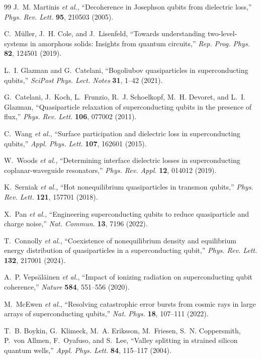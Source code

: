 \documentclass[11pt,letterpaper]{article}
\theoremstyle{definition}
\begin{document}
\begin{thebibliography}{99}
J.~M. Martinis \textit{et al.}, ``Decoherence in Josephson qubits from dielectric loss,'' \textit{Phys. Rev. Lett.} \textbf{95}, 210503 (2005).

C.~M\"uller, J.~H. Cole, and J.~Lisenfeld, ``Towards understanding two-level-systems in amorphous solids: Insights from quantum circuits,'' \textit{Rep. Prog. Phys.} \textbf{82}, 124501 (2019).

L.~I. Glazman and G.~Catelani, ``Bogoliubov quasiparticles in superconducting qubits,'' \textit{SciPost Phys. Lect. Notes} \textbf{31}, 1--42 (2021).

G.~Catelani, J.~Koch, L.~Frunzio, R.~J. Schoelkopf, M.~H. Devoret, and L.~I. Glazman, ``Quasiparticle relaxation of superconducting qubits in the presence of flux,'' \textit{Phys. Rev. Lett.} \textbf{106}, 077002 (2011).

C.~Wang \textit{et al.}, ``Surface participation and dielectric loss in superconducting qubits,'' \textit{Appl. Phys. Lett.} \textbf{107}, 162601 (2015).

W.~Woods \textit{et al.}, ``Determining interface dielectric losses in superconducting coplanar-waveguide resonators,'' \textit{Phys. Rev. Appl.} \textbf{12}, 014012 (2019).

K.~Serniak \textit{et al.}, ``Hot nonequilibrium quasiparticles in transmon qubits,'' \textit{Phys. Rev. Lett.} \textbf{121}, 157701 (2018).

X.~Pan \textit{et al.}, ``Engineering superconducting qubits to reduce quasiparticle and charge noise,'' \textit{Nat. Commun.} \textbf{13}, 7196 (2022).

T.~Connolly \textit{et al.}, ``Coexistence of nonequilibrium density and equilibrium energy distribution of quasiparticles in a superconducting qubit,'' \textit{Phys. Rev. Lett.} \textbf{132}, 217001 (2024).

A.~P. Veps\"al\"ainen \textit{et al.}, ``Impact of ionizing radiation on superconducting qubit coherence,'' \textit{Nature} \textbf{584}, 551--556 (2020).

M.~McEwen \textit{et al.}, ``Resolving catastrophic error bursts from cosmic rays in large arrays of superconducting qubits,'' \textit{Nat. Phys.} \textbf{18}, 107--111 (2022).

T.~B. Boykin, G.~Klimeck, M.~A. Eriksson, M.~Friesen, S.~N. Coppersmith, P.~von Allmen, F.~Oyafuso, and S.~Lee, ``Valley splitting in strained silicon quantum wells,'' \textit{Appl. Phys. Lett.} \textbf{84}, 115--117 (2004).

\end{thebibliography}
\end{document}
